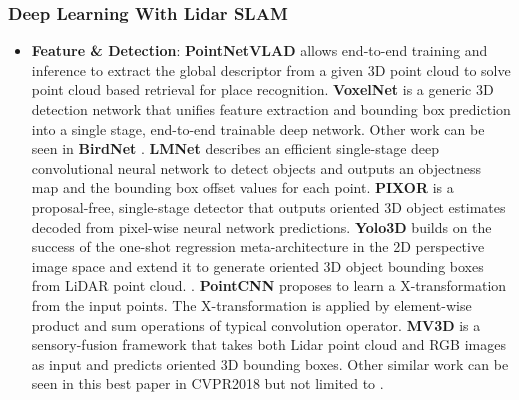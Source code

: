 \documentclass[journal,transmag]{IEEEtran}
\begin{document}
\subsubsection{Deep Learning With Lidar SLAM}
\begin{itemize}
    \item \textbf{Feature \& Detection}: \textbf{PointNetVLAD} \cite{angelina2018pointnetvlad} allows end-to-end training and inference to extract the global descriptor from a given 3D point cloud to solve point cloud based retrieval for place recognition. \textbf{VoxelNet} \cite{zhou2018voxelnet} is a generic 3D detection network that unifies feature extraction and bounding box prediction into a single stage, end-to-end trainable deep network. Other work can be seen in \textbf{BirdNet} \cite{beltran2018birdnet}. \textbf{LMNet} \cite{minemura2018lmnet}  describes an efficient single-stage deep convolutional neural network to detect objects and outputs an objectness map and the bounding box offset values for each point. \textbf{PIXOR} \cite{yang2018pixor} is a proposal-free, single-stage detector that outputs oriented 3D object estimates decoded from pixel-wise neural network predictions. \textbf{Yolo3D} \cite{ali2018yolo3d} builds on the success of the one-shot regression meta-architecture in the 2D perspective image space and extend it to generate oriented 3D object bounding boxes from LiDAR point cloud. . \textbf{PointCNN} \cite{li2018pointcnn} proposes to learn a X-transformation from the input points. The X-transformation is applied by element-wise product and sum operations of typical convolution operator. \textbf{MV3D} \cite{chen2017multi} is a sensory-fusion framework that takes both Lidar point cloud and RGB images as input and predicts oriented 3D bounding boxes. Other similar work can be seen in this best paper in CVPR2018 but not limited to \cite{su2018splatnet}. 

\end{itemize}
\end{document}
